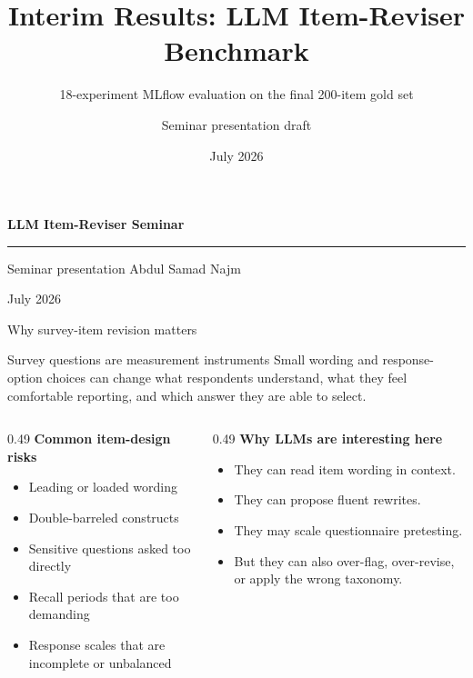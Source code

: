 \documentclass[aspectratio=169,10pt]{beamer}
\title[Item-Reviser Interim Results]{Interim Results: LLM Item-Reviser Benchmark}
\subtitle{18-experiment MLflow evaluation on the final 200-item gold set}
\author{Seminar presentation draft}
\date{July 2026}
\newcommand{\tight}{\setlength{\itemsep}{2pt}\setlength{\parskip}{0pt}}
\begin{document}
\begin{frame}[plain]
\centering
\vspace{1.1cm}
{\color{SeminarNavy}\Huge\bfseries LLM Item-Reviser Seminar\par}
\vspace{0.35cm}

{\color{SeminarNavy}\rule{0.82\linewidth}{1.2pt}\par}
\vspace{0.65cm}
{\large Seminar presentation Abdul Samad Najm\par}
\vspace{0.3cm}
{\normalsize July 2026\par}
\end{frame}

\begin{frame}{Why survey-item revision matters}
\begin{block}{Survey questions are measurement instruments}
Small wording and response-option choices can change what respondents understand, what they feel comfortable reporting, and which answer they are able to select.
\end{block}

\vspace{2mm}
\begin{columns}[T,onlytextwidth]
\begin{column}{0.49\textwidth}
\textbf{Common item-design risks}
\begin{itemize}\tight
  \item Leading or loaded wording
  \item Double-barreled constructs
  \item Sensitive questions asked too directly
  \item Recall periods that are too demanding
  \item Response scales that are incomplete or unbalanced
\end{itemize}
\end{column}
\begin{column}{0.49\textwidth}
\textbf{Why LLMs are interesting here}
\begin{itemize}\tight
  \item They can read item wording in context.
  \item They can propose fluent rewrites.
  \item They may scale questionnaire pretesting.
  \item But they can also over-flag, over-revise, or apply the wrong taxonomy.
\end{itemize}
\end{column}
\end{columns}
\end{frame}
\end{document}
